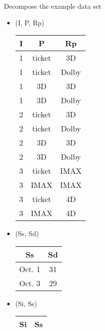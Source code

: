\documentclass[12pt]{article}
\begin{document}
\begin{enumerate}
        Decompose the example data set
        \begin{itemize}
          \item (I, P, Rp)
                \begin{center}
                  \begin{tabular}{c c c}
                    \hline
                    I  & P      & Rp \\
                    \hline
                    1  & ticket & 3D \\
                    1  & ticket & Dolby \\
                    1  & 3D     & 3D \\
                    1  & 3D     & Dolby \\
                    2  & ticket & 3D \\
                    2  & ticket & Dolby \\
                    2  & 3D     & 3D \\
                    2  & 3D     & Dolby \\
                    3  & ticket & IMAX \\
                    3  & IMAX   & IMAX \\
                    3  & ticket & 4D \\
                    3  & IMAX   & 4D \\
                    \hline
                  \end{tabular}
                \end{center}
          \item (Ss, Sd)
                \begin{center}
                  \begin{tabular}{c c}
                    \hline
                    Ss     & Sd \\
                    \hline
                    Oct. 1 & 31 \\
                    Oct. 3 & 29 \\
                    \hline                    
                  \end{tabular}
                \end{center}
          \item (Si, Ss)
                \begin{center}
                  \begin{tabular}{c c}
                    \hline
                    Si & Ss \\
                    \hline

\end{tabular}
\end{center}
\end{itemize}
\end{enumerate}
\end{document}
